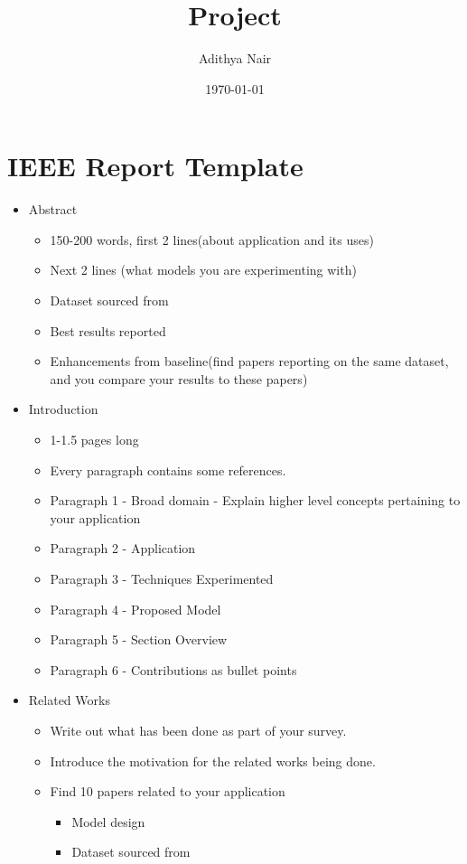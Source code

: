 \documentclass[11pt]{article}
\author{Adithya Nair}
\date{\today}
\title{Project}
\begin{document}
\maketitle
\tableofcontents

\section{IEEE Report Template}
\label{sec:orga98af04}
\begin{itemize}
\item Abstract
\begin{itemize}
\item 150-200 words, first 2 lines(about application and its uses)
\item Next 2 lines (what models you are experimenting with)
\item Dataset sourced from
\item Best results reported
\item Enhancements from baseline(find papers reporting on the same dataset, and you compare your results to these papers)
\end{itemize}
\item Introduction
\begin{itemize}
\item 1-1.5 pages long
\item Every paragraph contains some references.
\item Paragraph 1 - Broad domain - Explain higher level concepts pertaining to your application
\item Paragraph 2 - Application
\item Paragraph 3 - Techniques Experimented
\item Paragraph 4 - Proposed Model
\item Paragraph 5 - Section Overview
\item Paragraph 6 - Contributions as bullet points
\end{itemize}
\item Related Works
\begin{itemize}
\item Write out what has been done as part of your survey.
\item Introduce the motivation for the related works being done.
\item Find 10 papers related to your application
\begin{itemize}
\item Model design
\item Dataset sourced from

\end{itemize}
\end{itemize}
\end{itemize}
\end{document}
